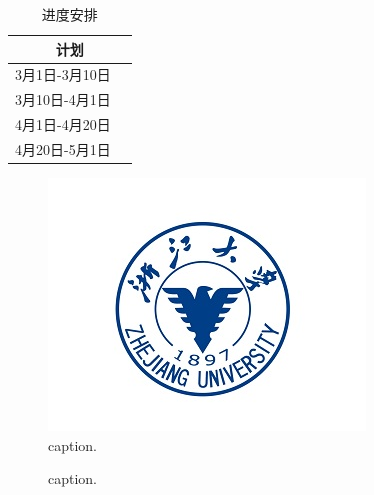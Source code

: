 \documentclass[oneside,a4paper]{article}
\begin{document}
\begin{table}[!htbp]
    \centering
    \label{table1}
    \caption{进度安排}
    \begin{tabular}{|l|l|}
        \hline
        \multicolumn{2}{|c|}{计划} \\
        \hline
        3月1日-3月10日 &             \\
        \hline
        3月10日-4月1日 &             \\
        \hline
        4月1日-4月20日 &             \\
        \hline
        4月20日-5月1日 &             \\
        \hline
    \end{tabular}
\end{table}

\begin{figure}[H]
    \centering
    \includegraphics[width=0.75\textwidth]{figure.png}
    \caption{caption.}
    \label{fig_1}
\end{figure}

\begin{figure}[!htbp]
    \centering
    \hfil
    \caption{caption.}
    \label{fig_sim_0}
\end{figure}
\end{document}
